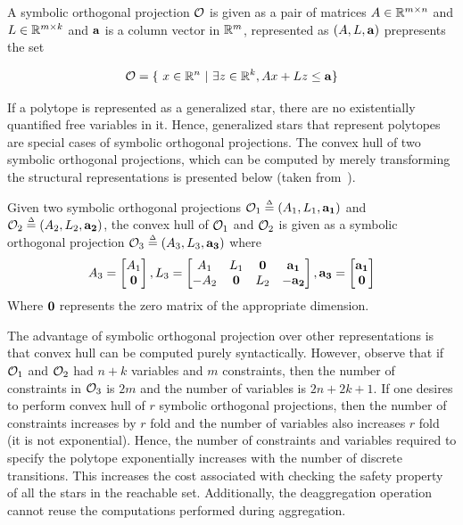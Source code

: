 \begin{definition}
A symbolic orthogonal projection $\mathcal{O}$ is given as a pair of matrices $A \in \reals^{m \times n}$ and $L \in \reals^{m \times k}$ and ${\bf a}$ is a column vector in $\reals^m$, represented as $(A, L, {\bf a})$ prepresents the set

$$
\O = \{~x \in \reals^n~|~ \exists z \in \reals^k, Ax + Lz \leq {\bf a}\}
$$ 
\end{definition}

If a polytope is represented as a generalized star, there are no existentially quantified free variables in it. Hence, generalized stars that represent polytopes are special cases of symbolic orthogonal projections. The convex hull of two symbolic orthogonal projections, which can be computed by merely transforming the structural representations is presented below (taken from~\cite{hagemann2014reachability}).

\begin{definition}
Given two symbolic orthogonal projections $\mathcal{O}_1 \mathrel{\stackrel{\scriptscriptstyle\Delta}{=}} (A_1, L_1, {\bf a_1})$ and $\mathcal{O}_2 \mathrel{\stackrel{\scriptscriptstyle\Delta}{=}} (A_2, L_2, {\bf a_2})$, the convex hull of $\mathcal{O}_1$ and $\mathcal{O}_2$ is given as a symbolic orthogonal projection $\mathcal{O}_3 \mathrel{\stackrel{\scriptscriptstyle\Delta}{=}} (A_3, L_3, {\bf a_3})$ where 
$$
A_3 = 
\begin{bmatrix} 
A_1 \\ 
{\bf 0} 
\end{bmatrix}, 
L_3 = 
\begin{bmatrix} 
A_1 & L_1 & {\bf 0} & {\bf a_1} \\
-A_2 & {\bf 0} & L_2 & -{\bf a_2}
\end{bmatrix},
{\bf a_3} =
\begin{bmatrix}
{\bf a_1} \\
{\bf 0}
\end{bmatrix}
$$
Where ${\bf 0}$ represents the zero matrix of the appropriate dimension. 
\end{definition}

The advantage of symbolic orthogonal projection over other representations is that convex hull can be computed purely syntactically. 
%
However, observe that if $\mathcal{O}_1$ and $\mathcal{O}_2$ had $n+k$ variables and $m$ constraints, then the number of constraints in $\mathcal{O}_3$ is $2m$ and the number of variables is $2n+2k+1$. 
%
If one desires to perform convex hull of $r$ symbolic orthogonal projections, then the number of constraints increases by $r$ fold and the number of variables also increases  $r$ fold (it is not exponential). 
%
Hence, the number of constraints and variables required to specify the polytope exponentially increases with the number of discrete transitions. This increases the cost associated with checking the safety property of all the stars in the reachable set. Additionally, the deaggregation operation cannot reuse the computations performed during aggregation.


